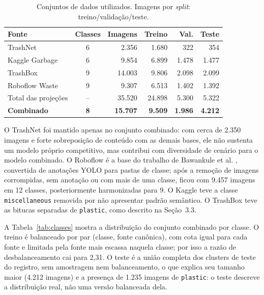 \documentclass[11pt,a4paper]{article}
\begin{document}
	\begin{table}[htbp]
		\centering
		\small
		\caption{Conjuntos de dados utilizados. Imagens por \textit{split}: treino/validação/teste.}
		\label{tab:datasets}
		\begin{tabular}{lcrrrr}
			\toprule
			\textbf{Fonte} & \textbf{Classes} & \textbf{Imagens} & \textbf{Treino} & \textbf{Val.} & \textbf{Teste} \\
			\midrule
			TrashNet \cite{thung2016} & 6 & 2.356 & 1.680 & 322 & 354 \\
			Kaggle Garbage \cite{kaggle_garbage} & 6 & 9.854 & 6.899 & 1.478 & 1.477 \\
			TrashBox \cite{kumsetty2022} & 9 & 14.003 & 9.806 & 2.098 & 2.099 \\
			Roboflow Waste \cite{roboflow_waste} & 9 & 9.307 & 6.513 & 1.402 & 1.392 \\
			\midrule
			Total das projeções & -- & 35.520 & 24.898 & 5.300 & 5.322 \\
			\midrule
			\textbf{Combinado} & \textbf{8} & \textbf{15.707} & \textbf{9.509} & \textbf{1.986} & \textbf{4.212} \\
			\bottomrule
		\end{tabular}
	\end{table}
	
	O TrashNet \cite{thung2016} foi mantido apenas no conjunto combinado: com cerca de 2.350 imagens e forte sobreposição de conteúdo com as demais bases, ele não sustenta um modelo próprio competitivo, mas contribui com diversidade de cenário para o modelo combinado. O Roboflow é a base do trabalho de Bawankule et al. \cite{bawankule2023}, convertida de anotações YOLO para pastas de classe; após a remoção de imagens corrompidas, sem anotação ou com mais de uma classe, ficou com 9.457 imagens em 12 classes, posteriormente harmonizadas para 9. O Kaggle \cite{kaggle_garbage} teve a classe \texttt{miscellaneous} removida por não apresentar padrão semântico. O TrashBox \cite{kumsetty2022} teve as bitucas separadas de \texttt{plastic}, como descrito na Seção~3.3.
	
	A Tabela~\ref{tab:classes} mostra a distribuição do conjunto combinado por classe. O treino é balanceado por par (classe, fonte canônica), com cota igual para cada fonte e limitada pela fonte mais escassa naquela classe; por isso a razão de desbalanceamento cai para 2,31. O teste é a união completa dos clusters de teste do registro, sem amostragem nem balanceamento, o que explica seu tamanho maior (4.212 imagens) e a presença de 1.235 imagens de \texttt{plastic}: o teste descreve a distribuição real, não uma versão balanceada dela.
	
\end{document}
